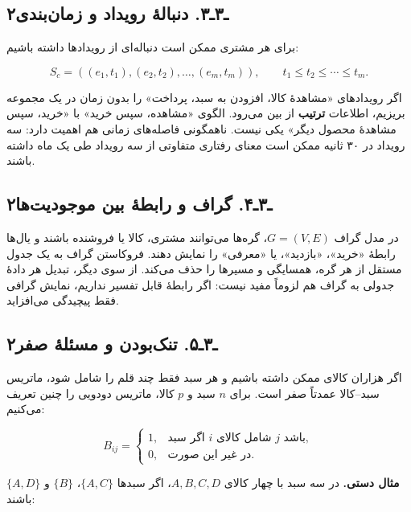 \documentclass[12pt,a4paper,oneside]{book}
\begin{document}
\subsection{۲ـ۳ـ۳. دنبالهٔ رویداد و زمان‌بندی}\label{ux640ux6f3ux640ux6f3.-ux62fux646ux628ux627ux644ux647-ux631ux648ux6ccux62fux627ux62f-ux648-ux632ux645ux627ux646ux628ux646ux62fux6cc}

برای هر مشتری ممکن است دنباله‌ای از رویدادها داشته باشیم:

\[
S_c=((e_1,t_1),(e_2,t_2),\ldots,(e_m,t_m)),\qquad t_1\leq t_2\leq\cdots\leq t_m.
\]

اگر رویدادهای «مشاهدهٔ کالا، افزودن به سبد، پرداخت» را بدون زمان در یک مجموعه بریزیم، اطلاعات \textbf{ترتیب} از بین می‌رود. الگوی «مشاهده، سپس خرید» با «خرید، سپس مشاهدهٔ محصول دیگر» یکی نیست. ناهمگونی فاصله‌های زمانی هم اهمیت دارد: سه رویداد در ۳۰ ثانیه ممکن است معنای رفتاری متفاوتی از سه رویداد طی یک ماه داشته باشند.

\subsection{۲ـ۳ـ۴. گراف و رابطهٔ بین موجودیت‌ها}\label{ux640ux6f3ux640ux6f4.-ux6afux631ux627ux641-ux648-ux631ux627ux628ux637ux647-ux628ux6ccux646-ux645ux648ux62cux648ux62fux6ccux62aux647ux627}

در مدل گراف \(G=(V,E)\)، گره‌ها می‌توانند مشتری، کالا یا فروشنده باشند و یال‌ها رابطهٔ «خرید»، «بازدید»، یا «معرفی» را نمایش دهند. فروکاستن گراف به یک جدول مستقل از هر گره، همسایگی و مسیرها را حذف می‌کند. از سوی دیگر، تبدیل هر دادهٔ جدولی به گراف هم لزوماً مفید نیست: اگر رابطهٔ قابل تفسیر نداریم، نمایش گرافی فقط پیچیدگی می‌افزاید.

\subsection{۲ـ۳ـ۵. تنک‌بودن و مسئلهٔ صفر}\label{ux640ux6f3ux640ux6f5.-ux62aux646ux6a9ux628ux648ux62fux646-ux648-ux645ux633ux626ux644ux647-ux635ux641ux631}

اگر هزاران کالای ممکن داشته باشیم و هر سبد فقط چند قلم را شامل شود، ماتریس سبد--کالا عمدتاً صفر است. برای \(n\) سبد و \(p\) کالا، ماتریس دودویی را چنین تعریف می‌کنیم:

\[
B_{ij}=\begin{cases}1,&\text{اگر سبد }i\text{ شامل کالای }j\text{ باشد},\\0,&\text{در غیر این صورت}.
\end{cases}
\]

\textbf{مثال دستی.} در سه سبد با چهار کالای \(A,B,C,D\)، اگر سبدها \(\{A,C\}\)، \(\{B\}\) و \(\{A,D\}\) باشند:
\end{document}
